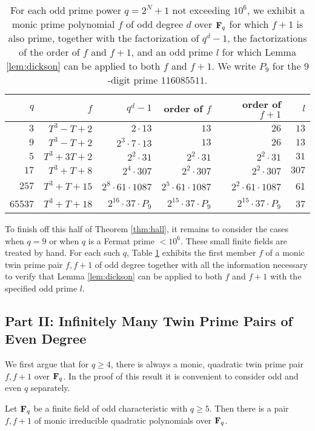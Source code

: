\documentclass[a4paper]{compositio}
\begin{document}
\begin{table} \caption{\label{tbl:smalltwins} For each odd prime power $q = 2^N+1$ not exceeding $10^6$,
we exhibit a monic prime polynomial $f$ of odd degree $d$ over
$\mathbf{F}_q$ for which $f+1$ is also prime, together with the
factorization of $q^d-1$, the factorizations of the order of $f$ and
$f+1$, and an odd prime $l$ for which Lemma \ref{lem:dickson} can be
applied to both $f$ and $f+1$. We write $P_9$ for the $9$-digit
prime $116085511$.} \small \centering \begin{tabular}{r|r|r|r|r|r}
$q$ & $f$ &\textbf{$q^d-1$} & \textbf{order of $f$} & \textbf{order
of $f+1$} & \textbf{$l$}\\\hline\hline\rule{0pt}{9pt} $3$ &
$T^3-T+2$ & $2\cdot 13$ & $13$ & $26$ & $13$\\
$9$ &
$T^3-T+2$ & $2^3 \cdot 7 \cdot 13$ & $13$ & $26$ & $13$\\
$5$ & $T^3+3T + 2$ & $2^2 \cdot 31$ & $2^2\cdot 31$ & $2^2\cdot 31$
&
$31$ \\
$17$ & $T^3 + T + 8$ & $2^4\cdot 307$ & $2^2\cdot 307$ & $2^2\cdot
307$ & $307$ \\
$257$ & $T^3+T+15$ & $2^8 \cdot 61 \cdot 1087$ & $2^5\cdot 61 \cdot
1087$ & $2^2\cdot 61 \cdot 1087$ & 61 \\ 65537 & $T^3+T+18$ &
$2^{16}\cdot 37\cdot P_9$ & $2^{15}\cdot 37\cdot P_9$ & $2^{15}\cdot
37\cdot P_9$ & 37
\end{tabular}
\normalsize
\end{table}

To finish off this half of Theorem \ref{thm:hall}, it remains to
consider the cases when $q=9$ or when $q$ is a Fermat prime $<
10^{6}$. These small finite fields are treated by hand. For each
such $q$, Table \ref{tbl:smalltwins} exhibits the first member $f$
of a monic twin prime pair $f, f+1$ of odd degree together with all
the information necessary to verify that Lemma \ref{lem:dickson} can
be applied to both $f$ and $f+1$ with the specified odd prime $l$.

\subsection{Part II: Infinitely Many Twin Prime Pairs of
Even Degree} We first argue that for $q \geq 4$, there is always a
monic, quadratic twin prime pair $f, f+1$ over $\mathbf{F}_q$. In the proof
of this result it is convenient to consider odd and even $q$
separately.

\begin{lem}\label{lem:quadratic1} Let $\mathbf{F}_q$ be a finite field of odd characteristic with $q\geq 5$. Then there is
a pair $f, f+1$ of monic irreducible quadratic polynomials over
$\mathbf{F}_q$.
\end{lem}
\end{document}
